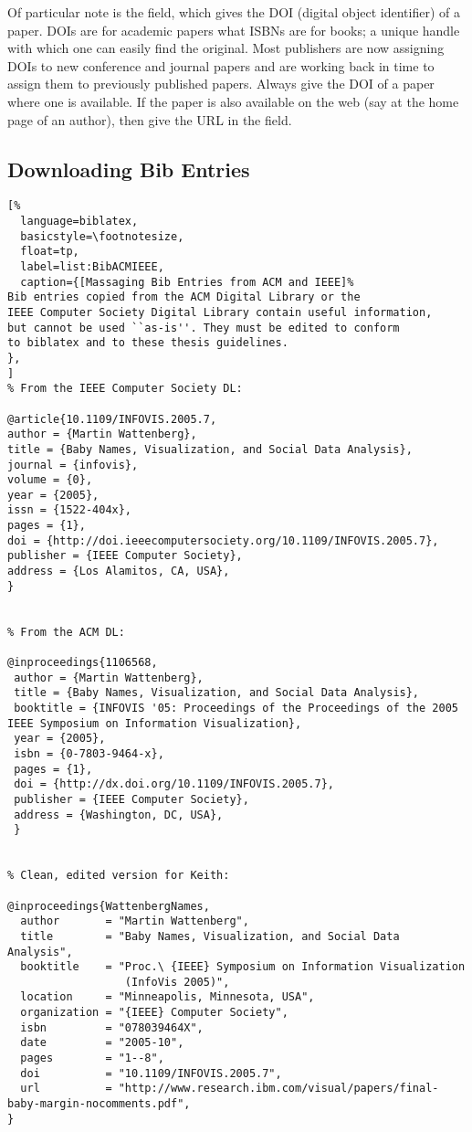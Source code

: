 Of particular note is the  field, which gives the DOI
(digital object identifier) of a paper. DOIs are for academic papers
what ISBNs are for books; a unique handle with which one can easily
find the original. Most publishers are now assigning DOIs to new
conference and journal papers and are working back in time to assign
them to previously published papers. Always give the DOI of a paper
where one is available. If the paper is also available on the web (say
at the home page of an author), then give the URL in the 
field.






\subsection{Downloading Bib Entries}



\begin{lstlisting}[%
  language=biblatex,
  basicstyle=\footnotesize,
  float=tp,
  label=list:BibACMIEEE,
  caption={[Massaging Bib Entries from ACM and IEEE]%
Bib entries copied from the ACM Digital Library or the
IEEE Computer Society Digital Library contain useful information,
but cannot be used ``as-is''. They must be edited to conform
to biblatex and to these thesis guidelines.
},
]
% From the IEEE Computer Society DL:

@article{10.1109/INFOVIS.2005.7,
author = {Martin Wattenberg},
title = {Baby Names, Visualization, and Social Data Analysis},
journal = {infovis},
volume = {0},
year = {2005},
issn = {1522-404x},
pages = {1},
doi = {http://doi.ieeecomputersociety.org/10.1109/INFOVIS.2005.7},
publisher = {IEEE Computer Society},
address = {Los Alamitos, CA, USA},
}


% From the ACM DL:

@inproceedings{1106568,
 author = {Martin Wattenberg},
 title = {Baby Names, Visualization, and Social Data Analysis},
 booktitle = {INFOVIS '05: Proceedings of the Proceedings of the 2005 IEEE Symposium on Information Visualization},
 year = {2005},
 isbn = {0-7803-9464-x},
 pages = {1},
 doi = {http://dx.doi.org/10.1109/INFOVIS.2005.7},
 publisher = {IEEE Computer Society},
 address = {Washington, DC, USA},
 }


% Clean, edited version for Keith:

@inproceedings{WattenbergNames,
  author       = "Martin Wattenberg",
  title        = "Baby Names, Visualization, and Social Data Analysis",
  booktitle    = "Proc.\ {IEEE} Symposium on Information Visualization
                  (InfoVis 2005)",
  location     = "Minneapolis, Minnesota, USA",
  organization = "{IEEE} Computer Society",
  isbn         = "078039464X",
  date         = "2005-10",
  pages        = "1--8",
  doi          = "10.1109/INFOVIS.2005.7",
  url          = "http://www.research.ibm.com/visual/papers/final-baby-margin-nocomments.pdf",
}
\end{lstlisting}


